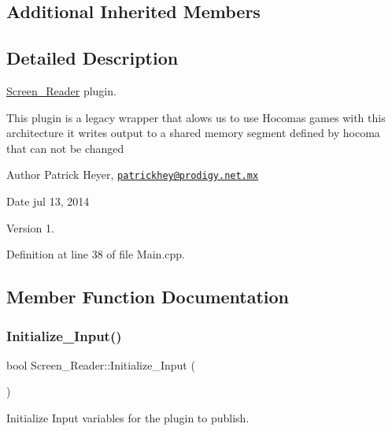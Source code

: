 \subsection*{Additional Inherited Members}


\subsection{Detailed Description}
\hyperlink{class_screen___reader}{Screen\+\_\+\+Reader} plugin. 

This plugin is a legacy wrapper that alows us to use Hocoma\textquotesingle{}s games with this architecture it writes output to a shared memory segment defined by hocoma that can not be changed \begin{DoxyAuthor}{Author}
Patrick Heyer, \href{mailto:patrickhey@prodigy.net.mx}{\tt patrickhey@prodigy.\+net.\+mx} 
\end{DoxyAuthor}
\begin{DoxyDate}{Date}
jul 13, 2014 
\end{DoxyDate}
\begin{DoxyVersion}{Version}
1. 
\end{DoxyVersion}


Definition at line 38 of file Main.\+cpp.



\subsection{Member Function Documentation}
\mbox{\label{class_screen___reader_a40c7e767ec368074d63ba4d4e5e3e0bc}} 
\subsubsection{\texorpdfstring{Initialize\+\_\+\+Input()}{Initialize\_Input()}}
{\footnotesize\ttfamily bool Screen\+\_\+\+Reader\+::\+Initialize\+\_\+\+Input (\begin{DoxyParamCaption}{ }\end{DoxyParamCaption})\hspace{0.3cm}{\ttfamily [virtual]}}



Initialize Input variables for the plugin to publish. 

